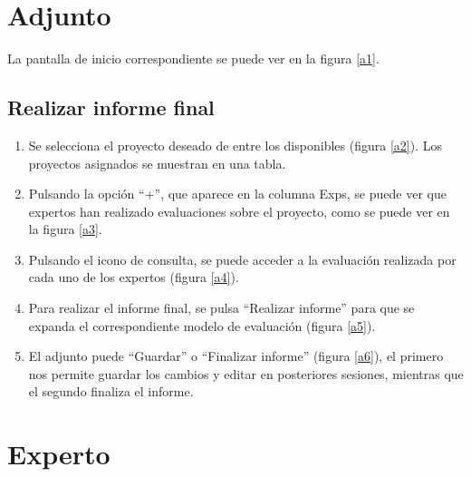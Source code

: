 \documentclass[11pt,a4paper,spanish,twoside]{book}
\begin{document}
\section{Adjunto}
La pantalla de inicio correspondiente se puede ver en la figura \ref{a1}.

\subsection{Realizar informe final}
\begin{enumerate}
\item Se selecciona el proyecto deseado de entre los disponibles (figura 
  \ref{a2}). Los proyectos asignados se muestran en una tabla.
  

\item Pulsando la opción ``+'', que aparece en la columna Exps, se puede ver que
  expertos han realizado evaluaciones sobre el proyecto, como se puede ver en
  la figura \ref{a3}. 


\item Pulsando el icono de consulta, se puede acceder a la evaluación realizada 
  por cada uno de los expertos (figura \ref{a4}).


\item Para realizar el informe final, se pulsa ``Realizar informe'' 
  para que se expanda el correspondiente modelo de evaluación (figura \ref{a5}).
  

\item El adjunto puede ``Guardar'' o ``Finalizar informe'' 
  (figura \ref{a6}), el primero nos permite guardar los cambios y editar en 
  posteriores sesiones, mientras que el segundo finaliza el informe.
  
\end{enumerate}

\section{Experto}
\end{document}
